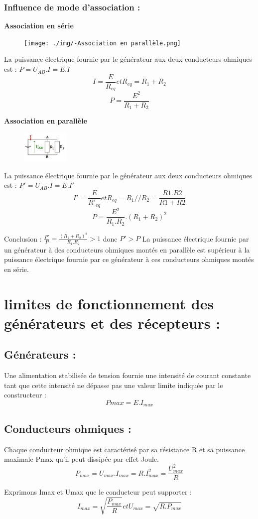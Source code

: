 \documentclass[12pt]{article}
\begin{document}
\subsubsection{Influence de mode d’association : }

\begin{center}
  \bf{Association en série }
\end{center}
\begin{figure}
  \vspace{-1cm}
    \texttt{[image: ./img/-Association en parallèle.png]}
\end{figure}

La puissance électrique fournie par le générateur aux deux
conducteurs ohmiques est : $ P = U_{AB}.I = E. I$
$$I = \frac{E}{R_{eq}} et R_{eq} = R_1 + R_2$$
$$P = \frac{E^2}{R_1 + R_2}$$

\begin{center}
  \bf{Association en parallèle}
\end{center}
\begin{figure}
  \vspace{-4cm}
    \includegraphics[width=0.2\textwidth]{./img/circxuit_parallele.png}
\end{figure}


La puissance électrique fournie par le générateur aux deux conducteurs ohmiques
est : $ P' = U_{AB}.I = E. I'$
$$I' = \frac{E}{R'_{eq}} et R_{eq} = R_1 // R_2 = \frac{R1.R2}{R1 + R2}$$
$$P = \frac{E^2}{R_1.R_2}.(R_1 + R_2)^2$$


Conclusion :
$\frac{P'}{P} = \frac{(R_1 + R_2)^2}{R_1.R_2} > 1 $ donc $P' > P$
La puissance électrique fournie par un générateur à des conducteurs ohmiques
montés en parallèle est supérieur à la puissance électrique fournie par ce générateur à
ces conducteurs ohmiques montés en série.

\section{limites de fonctionnement des générateurs et des récepteurs : }
\subsection{Générateurs : }
Une alimentation stabilisée de tension fournie une intensité de courant constante tant
que cette intensité ne dépasse pas une valeur limite indiquée par le constructeur :
$$Pmax = E. I_{max}$$
\subsection{Conducteurs ohmiques : }
Chaque conducteur ohmique est caractérisé par sa résistance R et sa puissance
maximale Pmax qu’il peut dissipée par effet Joule.
$$P_{max} = U_{max}.I_{max} = R.I^2_{max} = \frac{U_{max}^2}{R}$$

Exprimons Imax et Umax que le conducteur peut supporter :
$$I_{max} = \sqrt{\frac{P_{max}}{R}} et U_{max} = \sqrt{R.P_{max}}$$
\end{document}
